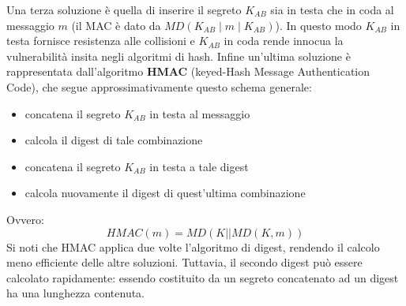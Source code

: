 Una terza soluzione è quella di inserire il segreto $K_{AB}$ sia in testa che in coda al messaggio $m$ (il MAC è dato da $MD(K_{AB} \mid m \mid K_{AB})$). In questo modo $K_{AB}$ in testa fornisce resistenza alle collisioni e $K_{AB}$ in coda rende innocua la vulnerabilità insita negli algoritmi di hash.
\newline \newline
Infine un'ultima soluzione è rappresentata dall'algoritmo \textbf{HMAC} (keyed-Hash Message Authentication Code), che segue approssimativamente questo schema generale:
\begin{itemize}
\item concatena il segreto $K_{AB}$ in testa al messaggio
\item calcola il digest di tale combinazione
\item concatena il segreto $K_{AB}$ in testa a tale digest
\item calcola nuovamente il digest di quest'ultima combinazione
\end{itemize}
Ovvero:
\begin{equation}
HMAC(m) = MD(K || MD(K, m))
\end{equation}
Si noti che HMAC applica due volte l'algoritmo di digest, rendendo il calcolo meno efficiente delle altre soluzioni. Tuttavia, il secondo digest può essere calcolato rapidamente: essendo costituito da un segreto concatenato ad un digest ha una lunghezza contenuta.

